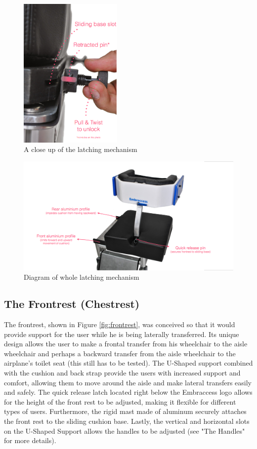 \begin{figure}[h]
\centering
\includegraphics[width=5cm]{images/AisleWheelchair4.png}
\caption{A close up of the latching mechanism}
\label{fig:latching}
\end{figure}


\begin{figure}[h]
\centering
\includegraphics[width=13cm]{images/AisleWheelchair5.png}
\caption{Diagram of whole latching mechanism}
\label{fig:base}
\end{figure}

\subsection{The Frontrest (Chestrest)}
The frontrest, shown in Figure \ref{fig:frontrest},  was conceived so that it would provide support for the user while he is being laterally transferred. Its unique design allows the user to make a frontal transfer from his wheelchair to the aisle wheelchair and perhaps a backward transfer from the aisle wheelchair to the airplane's toilet seat (this still has to be tested). The U-Shaped support combined with the cushion and back strap provide the users with increased support and comfort, allowing them to move around the aisle and make lateral transfers easily and safely. The quick release latch located right below the Embraccess logo allows for the height of the front rest to be adjusted, making it flexible for different types of users. Furthermore, the rigid mast made of aluminum securely attaches the front rest to the sliding cushion base. Lastly, the vertical and horizontal slots on the U-Shaped Support allows the handles to be adjusted (see "The Handles" for more details).

